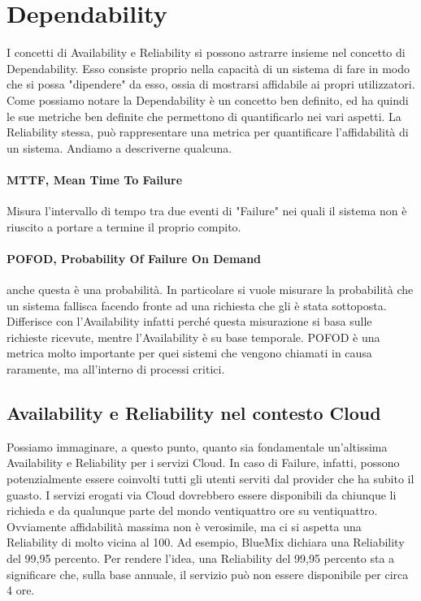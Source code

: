 \section{Dependability}
I concetti di Availability e Reliability si possono astrarre insieme nel concetto di Dependability. Esso consiste proprio nella capacità di un sistema di fare in modo che si possa "dipendere" da esso, ossia di mostrarsi affidabile ai propri utilizzatori. Come possiamo notare la Dependability è un concetto ben definito, ed ha quindi le sue metriche ben definite che permettono di quantificarlo nei vari aspetti. La Reliability stessa, può rappresentare una metrica per quantificare l'affidabilità di un sistema. Andiamo a descriverne qualcuna.


\paragraph{MTTF, Mean Time To Failure}
Misura l'intervallo di tempo tra due eventi di "Failure" nei quali il sistema non è riuscito a portare a termine il proprio compito.

\paragraph{POFOD, Probability Of Failure On Demand} 
anche questa è una probabilità. In particolare si vuole misurare la probabilità che un sistema fallisca facendo fronte ad una richiesta che gli è stata sottoposta. Differisce con l'Availability infatti perché questa misurazione si basa sulle richieste ricevute, mentre l'Availability è su base temporale. POFOD è una metrica molto importante per quei sistemi che vengono chiamati in causa raramente, ma all'interno di processi critici.


\subsection{Availability e Reliability nel contesto Cloud}
Possiamo immaginare, a questo punto, quanto sia fondamentale un'altissima Availability e Reliability per i servizi Cloud. In caso di Failure, infatti, possono potenzialmente essere coinvolti tutti gli utenti serviti dal provider che ha subito il guasto. I servizi erogati via Cloud dovrebbero essere disponibili da chiunque li richieda e da qualunque parte del mondo ventiquattro ore su ventiquattro. Ovviamente affidabilità massima non è verosimile, ma ci si aspetta una Reliability di molto vicina al 100. Ad esempio, BlueMix dichiara una Reliability del 99,95 percento. Per rendere l'idea, una Reliability del 99,95 percento sta a significare che, sulla base annuale, il servizio può non essere disponibile per circa 4 ore. 

